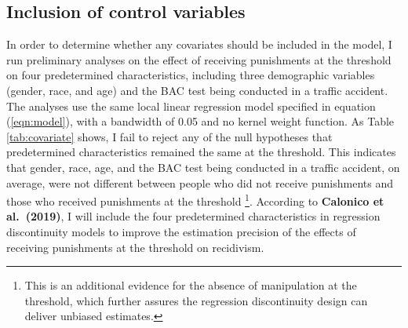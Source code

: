 \documentclass[
  11pt,
]{article}
\begin{document}
\hypertarget{inclusion-of-control-variables}{%
\subsection{Inclusion of control
variables}\label{inclusion-of-control-variables}}

In order to determine whether any covariates should be included in the
model, I run preliminary analyses on the effect of receiving punishments
at the threshold on four predetermined characteristics, including three
demographic variables (gender, race, and age) and the BAC test being
conducted in a traffic accident. The analyses use the same local linear
regression model specified in equation (\ref{eqn:model}), with a
bandwidth of 0.05 and no kernel weight function. As Table
\ref{tab:covariate} shows, I fail to reject any of the null hypotheses
that predetermined characteristics remained the same at the threshold.
This indicates that gender, race, age, and the BAC test being conducted
in a traffic accident, on average, were not different between people who
did not receive punishments and those who received punishments at the
threshold
\footnote{This is an additional evidence for the absence of manipulation at the threshold, which further assures the regression discontinuity design can deliver unbiased estimates.}.
According to \textbf{Calonico et al.~(2019)}, I will include the four
predetermined characteristics in regression discontinuity models to
improve the estimation precision of the effects of receiving punishments
at the threshold on recidivism.

\begingroup
\renewcommand{\arraystretch}{1.3}
\end{document}
